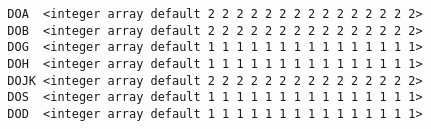 \begin{verbatim}
  DOA  <integer array default 2 2 2 2 2 2 2 2 2 2 2 2 2 2 2>
  DOB  <integer array default 2 2 2 2 2 2 2 2 2 2 2 2 2 2 2>
  DOG  <integer array default 1 1 1 1 1 1 1 1 1 1 1 1 1 1 1>
  DOH  <integer array default 1 1 1 1 1 1 1 1 1 1 1 1 1 1 1>
  DOJK <integer array default 2 2 2 2 2 2 2 2 2 2 2 2 2 2 2>
  DOS  <integer array default 1 1 1 1 1 1 1 1 1 1 1 1 1 1 1>
  DOD  <integer array default 1 1 1 1 1 1 1 1 1 1 1 1 1 1 1>
\end{verbatim}
